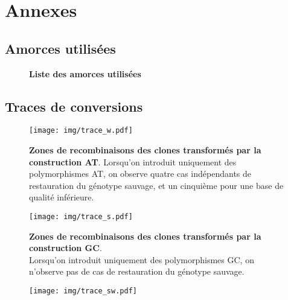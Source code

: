 \newpage
{}
\setcounter{page}{1}

\begin{multicols}{2}
\rmfamily
\footnotesize

\end{multicols}

\newpage

\setcounter{section}{0}
\section{Annexes}
\setcounter{subsection}{1}


\subsection{Amorces utilisées}
\label{subsec:amorces}

\begin{figure}[h]

\caption{\textbf{Liste des amorces utilisées}}
\end{figure}

\subsection{Traces de conversions}
\label{sec:trac-de-conv}

\begin{figure}[p]%
  \begin{leftfullpage}
    \texttt{[image: img/trace\_w.pdf]}
    \caption{\label{fig:tracew}\textbf{Zones de recombinaisons des clones
        transformés par la construction AT}. Lorsqu'on introduit uniquement des
      polymorphismes AT, on observe quatre cas indépendants de restauration du
      génotype sauvage, et un cinquième pour une base de qualité inférieure. }
  \end{leftfullpage}
\end{figure}
\begin{figure}[p]%
  \begin{fullpage}
    \texttt{[image: img/trace\_s.pdf]}
    \caption{\label{fig:traces} \textbf{Zones de recombinaisons des clones
        transformés par la construction GC}. \\
    Lorsqu'on introduit uniquement des polymorphismes GC, on n'observe pas de
    cas de restauration du génotype sauvage. }
  \end{fullpage}
\end{figure}
\begin{figure}[p]%
  \begin{leftfullpage}
    \texttt{[image: img/trace\_sw.pdf]}
    \caption{\label{fig:tracesw} }
  \end{leftfullpage}
\end{figure}

